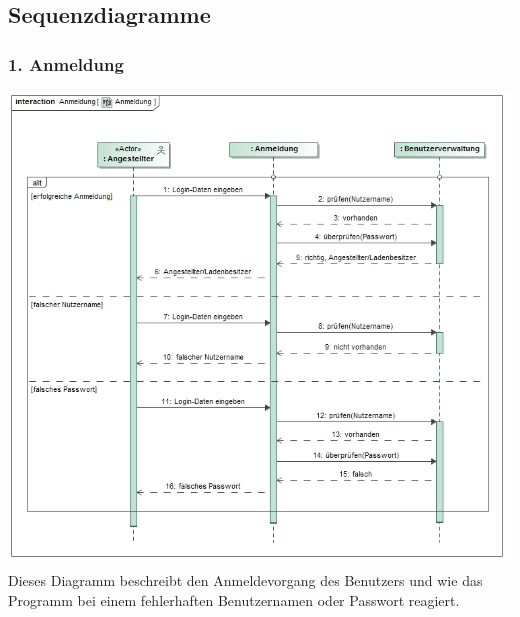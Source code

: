 \documentclass[pdftex,12pt,a4paper]{article}
\begin{document}
\subsection*{Sequenzdiagramme}
\subsubsection*{1. Anmeldung}
\includegraphics[width=1\textwidth]{./images/anmeldung}
Dieses Diagramm beschreibt den Anmeldevorgang des Benutzers und wie das Programm bei einem fehlerhaften Benutzernamen oder Passwort reagiert.
\end{document}
